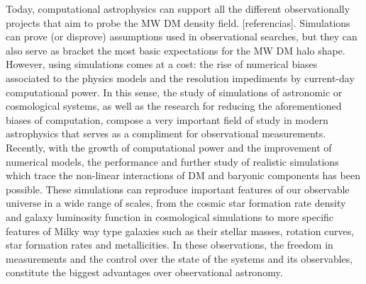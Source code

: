 \documentclass[12pt]{article}
\begin{document}
Today, computational astrophysics can support all the different observationally projects that aim to probe the MW DM density field. [referencias].
Simulations can prove (or disprove) assumptions used in observational searches, but they can also serve as bracket the most
basic expectations for the MW DM halo shape.
However, using simulations comes at a cost: the rise of numerical biases associated to the physics models and the resolution impediments 
by current-day computational power. In this sense, the study of simulations of astronomic or cosmological systems, as well as the research for reducing the aforementioned biases of computation, compose a very important field of study in modern astrophysics that serves as a compliment for observational measurements.\\

Recently, with the growth of computational power and the improvement of numerical models, the performance and further study of realistic simulations which trace the non-linear interactions of DM and baryonic components has been possible. These simulations can reproduce important features of our observable universe in a wide range of scales, from the cosmic star formation rate density and galaxy luminosity function in cosmological simulations to more specific features of Milky way type galaxies such as their stellar masses, rotation curves, star formation rates and metallicities. In these observations, the freedom in measurements and the control over the state of the systems and its observables, constitute the biggest advantages over observational astronomy.\\
\end{document}
